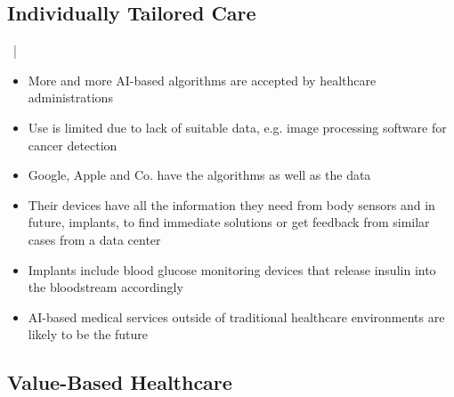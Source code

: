 \documentclass[xcolor=dvipsnames, aspectratio=1610]{beamer}
\begin{document}

\subsection{Individually Tailored Care}%
\label{sub:individually_tailored_care}

\begin{frame}{\secname\ | \subsecname}
    \begin{itemize}[<+->]
        \item More and more AI-based algorithms are accepted by healthcare administrations \cite{fdaAi}
        \item Use is limited due to lack of suitable data, e.g. image processing software for cancer detection \cite{kiKroenung}
        \item Google, Apple and Co. have the algorithms as well as the data
        \item Their devices have all the information they need from body sensors and in future, implants, to find immediate solutions or get feedback from similar cases from a data center \cite{kiKroenung}
        \item Implants include blood glucose monitoring devices that release insulin into the bloodstream accordingly \cite{rege2017development}
        \item AI-based medical services outside of traditional healthcare environments are likely to be the future
    \end{itemize}
\end{frame}


\subsection{Value-Based Healthcare}%
\label{sub:value_based_healthcare}
\end{document}
